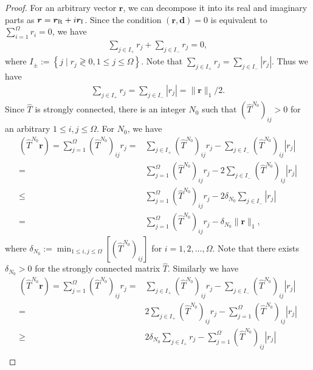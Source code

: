 \begin{proof}
	For an arbitrary vector $\bm{r}$, we can decompose it into its real and imaginary parts as $\bm{r}=\bm{r}_{\rm R} + i\bm{r}_{\rm I}$. Since the condition $(\bm{r},\bm{d}) = 0$ is equivalent to $\sum_{i=1}^{\Omega}r_{i} = 0$, we have
	\begin{align}
	\sum_{j\in I_{+}}r_{j} + \sum_{j\in I_{-}}r_{j} = 0,
	\end{align}
	where $I_{\pm}:=\left\{j\mid r_{j}\gtrless 0,1\leq j\leq \Omega\right\}$. Note that $\sum_{j\in I_{+}}r_{j} = \sum_{j\in I_{-}}|r_{j}|$.  Thus we have
	\begin{align}
	\sum_{j\in I_{+}}r_{j} = \sum_{j\in I_{-}}|r_{j}| = \|\bm{r}\|_{1} / 2.
	\end{align}
	Since $\hat{T}$ is strongly connected, there is an integer $N_{0}$ such that $\left(\hat{T}^{N_{0}}\right)_{ij}>0$ for an arbitrary $1\leq i,j\leq \Omega$. For $N_{0}$, we have
	\begin{align}
	\left(\hat{T}^{N_{0}}\bm{r}\right) = \sum_{j=1}^{\Omega}\left(\hat{T}^{N_{0}}\right)_{ij}r_{j} =& \sum_{j\in I_{+}}\left(\hat{T}^{N_{0}}\right)_{ij}r_{j} - \sum_{j\in I_{-}}\left(\hat{T}^{N_{0}}\right)_{ij}|r_{j}|\\
	=& \sum_{j=1}^{\Omega}\left(\hat{T}^{N_{0}}\right)_{ij}r_{j} - 2\sum_{j\in I_{-}}\left(\hat{T}^{N_{0}}\right)_{ij}|r_{j}|\\
	\leq& \sum_{j=1}^{\Omega}\left(\hat{T}^{N_{0}}\right)_{ij}r_{j} - 2\delta_{N_{0}}\sum_{j\in I_{-}}|r_{j}|\\
	=& \sum_{j=1}^{\Omega}\left(\hat{T}^{N_{0}}\right)_{ij}r_{j} - \delta_{N_{0}}\|\bm{r}\|_{1},
	\end{align}
	where $\displaystyle\delta_{N_{0}}:= \min_{1\leq i,j\leq \Omega}\left[\left(\hat{T}^{N_{0}}\right)_{ij}\right]$ for $i=1,2,\dots,\Omega$. Note that there exists $\delta_{N_{0}} > 0$ for the strongly connected matrix   $\hat{T}$. Similarly we have
	\begin{align}
	\left(\hat{T}^{N_{0}}\bm{r}\right) = \sum_{j=1}^{\Omega}\left(\hat{T}^{N_{0}}\right)_{ij}r_{j} =& \sum_{j\in I_{+}}\left(\hat{T}^{N_{0}}\right)_{ij}r_{j} - \sum_{j\in I_{-}}\left(\hat{T}^{N_{0}}\right)_{ij}|r_{j}|\\
	=& 2\sum_{j\in I_{+}}\left(\hat{T}^{N_{0}}\right)_{ij}r_{j} - \sum_{j=1}^{\Omega}\left(\hat{T}^{N_{0}}\right)_{ij}|r_{j}|\\
	\geq& 2\delta_{N_{0}}\sum_{j\in I_{+}}r_{j} - \sum_{j=1}^{\Omega}\left(\hat{T}^{N_{0}}\right)_{ij}|r_{j}|\\

\end{align}
\end{proof}
